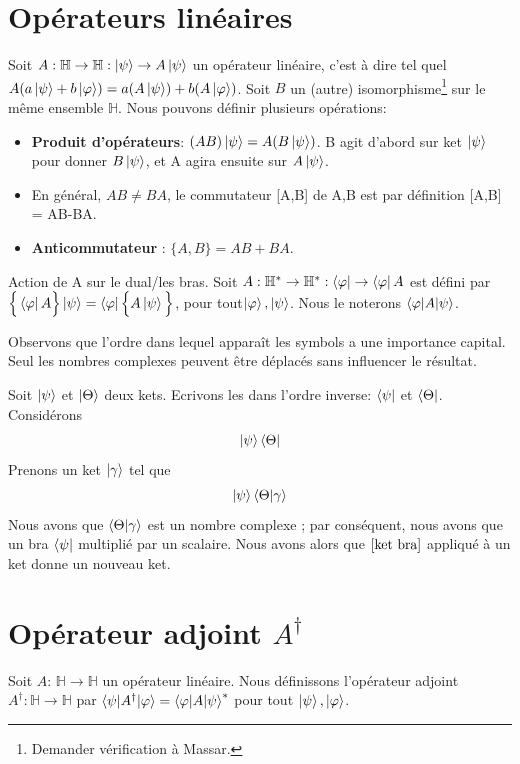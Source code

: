 \documentclass[../notesdecours.tex]{subfiles}
\begin{document}
\section{Opérateurs linéaires}
Soit $A : \mathbb{H} \rightarrow \mathbb{H} : \ket{\psi} \rightarrow A\ket{\psi}$ un opérateur linéaire, c'est à dire tel quel $A(a\ket{\psi}+b\ket{\varphi}) = a(A\ket{\psi})+b(A\ket{\varphi})$. Soit $B$ un (autre) isomorphisme\footnote{Demander vérification à Massar.} sur le même ensemble $\mathbb{H}$. Nous pouvons définir plusieurs opérations:
\begin{itemize}
\item \textbf{Produit d'opérateurs}: $(AB)\ket{\psi} = A(B\ket{\psi})$. B agit d'abord sur ket $\ket{\psi}$ pour donner $B\ket{\psi}$, et A agira ensuite sur $A\ket{\psi}$.
\item En général, $AB\neq BA$, le commutateur [A,B] de A,B est par définition [A,B] = AB-BA.
\item \textbf{Anticommutateur} : $\bigg\{A,B\bigg\} = AB+BA$.
\end{itemize}
Action de A sur le dual/les bras. Soit $A: \mathbb{H}^* \rightarrow \mathbb{H}^* : \bra{\varphi} \rightarrow \bra{\varphi}A$ est défini par $\Big\{\bra{\varphi}A\Big\}\ket{\psi} = \bra{\varphi}\Big\{A\ket{\psi}\Big\}$, pour tout$\ket{\varphi},\ket{\psi}$. Nous le noterons $\braket{\varphi|A|\psi}$.
\begin{remark} Observons que l'ordre dans lequel apparaît les symbols a une importance capital. Seul les nombres complexes peuvent être déplacés sans influencer le résultat. \end{remark}

\begin{exemple} 
Soit $\ket{\psi}$ et $\ket{\Theta}$ deux kets. Ecrivons les dans l'ordre inverse: $\bra{\psi}$ et $\bra{\Theta}$. Considérons 
\begin{equation}
\ket{\psi}\bra{\Theta}
\label{ket bra}
\end{equation}
Prenons un ket $\ket{\gamma}$ tel que
\begin{equation}
\ket{\psi}\braket{\Theta|\gamma}
\end{equation}
Nous avons que $\braket{\Theta|\gamma}$ est un nombre complexe ; par conséquent, nous avons que un bra $\bra{\psi}$ multiplié par un scalaire. Nous avons alors que $\eqref{ket bra}$ appliqué à un ket donne un nouveau ket.
\end{exemple}

\section{Opérateur adjoint $A^\dag$}
\begin{definition} Soit $A$: $\mathbb{H} \rightarrow \mathbb{H}$ un opérateur linéaire. Nous définissons l'opérateur adjoint $A^\dag : \mathbb{H} \rightarrow \mathbb{H}$ par $\braket{\psi|A^\dag|\varphi} = \braket{\varphi|A|\psi}^*$ pour tout $\ket{\psi},\ket{\varphi}$. \end{definition}
\end{document}
